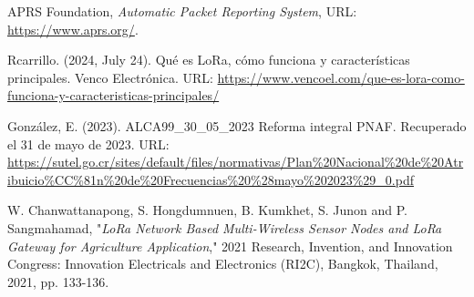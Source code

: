 \documentclass[conference]{IEEEtran}
\begin{document}
\newpage


\begin{thebibliography}{20}
 

     APRS Foundation, \textit{Automatic Packet Reporting System}, URL: \url{https://www.aprs.org/}.
    
     Rcarrillo. (2024, July 24). Qué es LoRa, cómo funciona y características principales. Venco Electrónica. URL: \url {https://www.vencoel.com/que-es-lora-como-funciona-y-caracteristicas-principales/}

     González, E. (2023). ALCA99\_30\_05\_2023 Reforma integral PNAF. Recuperado el 31 de mayo de 2023. URL: \url {https://sutel.go.cr/sites/default/files/normativas/Plan%20Nacional%20de%20Atribuicio%CC%81n%20de%20Frecuencias%20%28mayo%202023%29_0.pdf}


     W. Chanwattanapong, S. Hongdumnuen, B. Kumkhet, S. Junon and P. Sangmahamad, "\textit{LoRa Network Based Multi-Wireless Sensor Nodes and LoRa Gateway for Agriculture Application}," 2021 Research, Invention, and Innovation Congress: Innovation Electricals and Electronics (RI2C), Bangkok, Thailand, 2021, pp. 133-136. 
    
 
\end{thebibliography}
\end{document}

